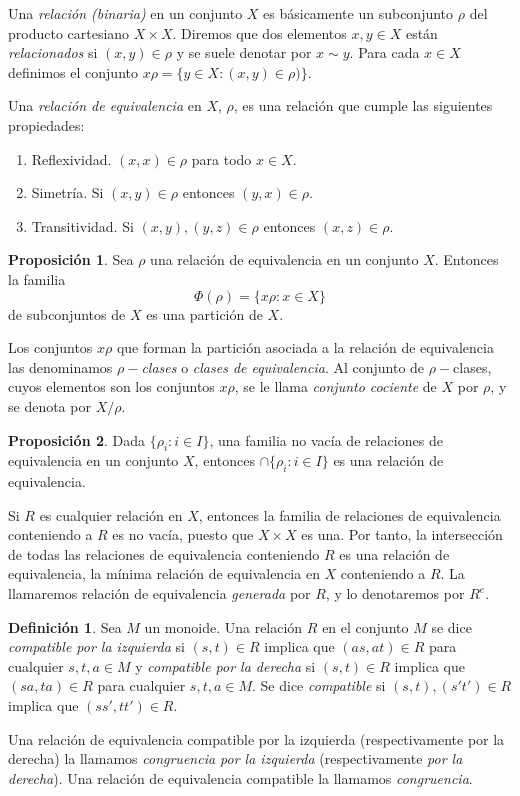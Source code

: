 \documentclass[12pt]{book}
\theoremstyle{definition}
\newtheorem{defi}{Definición}[section]
\newtheorem{prop}{Proposición}[section]
\begin{document}
Una \textit{relación (binaria)} en un conjunto $X$ es básicamente un subconjunto $\rho$ del producto cartesiano $X\times X$. Diremos que dos elementos $x,y\in X$ están \textit{relacionados} si $(x,y)\in\rho$ y se suele denotar por $x\sim y$. Para cada $x\in X$  definimos el conjunto $x\rho=\{y\in X:(x,y)\in\rho)\}$.
 
Una \textit{relación de equivalencia} en $X$, $\rho$, es una relación que cumple las siguientes propiedades:
\begin{enumerate}
\item Reflexividad. $(x,x)\in\rho$ para todo $x\in X$.
\item Simetría. Si $(x,y)\in\rho$ entonces $(y,x)\in\rho$.
\item Transitividad. Si $(x,y),(y,z)\in\rho$ entonces $(x,z)\in\rho$.
\end{enumerate}

\begin{prop}
Sea $\rho$ una relación de equivalencia en un conjunto $X$. Entonces la familia
$$\Phi(\rho)=\{x\rho:x\in X\}$$
de subconjuntos de $X$ es una partición de $X$.
\end{prop}

Los conjuntos $x\rho$ que forman la partición asociada a la relación de equivalencia las denominamos $\rho-$\textit{clases} o \textit{clases de equivalencia}. Al conjunto de $\rho-$clases, cuyos elementos son los conjuntos $x\rho$, se le llama \textit{conjunto cociente} de $X$ por $\rho$, y se denota por $X/\rho$.
\begin{prop}
Dada $\{\rho_i:i\in I\}$, una familia no vacía de relaciones de equivalencia en un conjunto $X$, entonces $\cap\{\rho_i:i\in I\}$ es una relación de equivalencia.
\end{prop}
Si $R$ es cualquier relación en $X$, entonces la familia de relaciones de equivalencia conteniendo a $R$ es no vacía, puesto que $X\times X$ es una. Por tanto, la intersección de todas las relaciones de equivalencia conteniendo $R$ es una relación de equivalencia, la mínima relación de equivalencia en $X$ conteniendo a $R$. La llamaremos relación de equivalencia \textit{generada} por $R$, y lo denotaremos por $R^e$.

\begin{defi}
Sea $M$ un monoide. Una relación $R$ en el conjunto $M$ se dice \textit{compatible por la izquierda} si $(s,t)\in R$ implica que $(as,at)\in R$ para cualquier $s,t,a\in M$ y \textit{compatible por la derecha} si $(s,t)\in R$ implica que $(sa,ta)\in R$ para cualquier $s,t,a\in M$. Se dice \textit{compatible} si $(s,t),(s't')\in R$ implica que $(ss',tt')\in R$.

Una relación de equivalencia compatible por la izquierda (respectivamente por la derecha) la llamamos \textit{congruencia por la izquierda} (respectivamente \textit{por la derecha}). Una relación de equivalencia compatible la llamamos \textit{congruencia}.
\end{defi}
\end{document}
